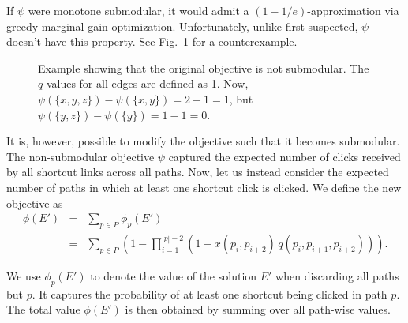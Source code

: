 \documentclass[11pt,letterpaper]{article}
\begin{document}
If $\psi$ were monotone submodular, it would admit a $(1-1/e)$-approximation via greedy marginal\hyp gain optimization.
Unfortunately, unlike first suspected, $\psi$ doesn't have this property.
See Fig.~\ref{fig:counterexample} for a counterexample.

\begin{figure}
 \centering
{}

\caption{Example showing that the original objective is not submodular. The $q$-values for all edges are defined as 1. Now, $\psi(\{x,y,z\}) - \psi(\{x,y\}) = 2-1 = 1$, but $\psi(\{y,z\}) - \psi(\{y\}) = 1-1 = 0$.}
 \label{fig:counterexample}
\end{figure}

It is, however, possible to modify the objective such that it becomes submodular.
The non-submodular objective $\psi$ captured the expected number of clicks received by all shortcut links across all paths.
Now, let us instead consider the expected number of paths in which at least one shortcut click is clicked.
We define the new objective as
\begin{eqnarray}
\phi(E')  &=& \sum_{p \in P} \phi_p(E') \\
          &=& \sum_{p \in P} \left( 1 - \prod_{i=1}^{|p|-2} \left( 1 - x(p_i,p_{i+2}) \, q(p_i,p_{i+1},p_{i+2}) \right) \right).
\end{eqnarray}

We use $\phi_p(E')$ to denote the value of the solution $E'$ when discarding all paths but $p$.
It captures the probability of at least one shortcut being clicked in path $p$.
The total value $\phi(E')$ is then obtained by summing over all path-wise values.
\end{document}
